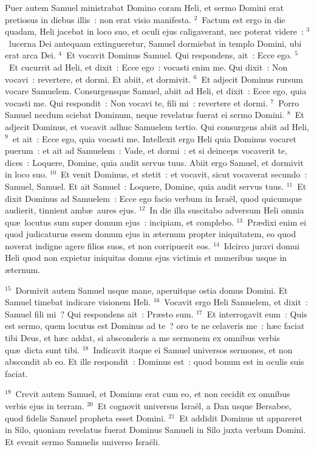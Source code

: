 \lettrine[lines=10,image=true,loversize=0.05,lraise=-0.03]{P}{}uer autem Samuel ministrabat Domino coram Heli, et sermo Domini erat pretiosus in diebus illis~: non erat visio manifesta.
${}^{2}$~Factum est ergo in die quadam, Heli jacebat in loco suo, et oculi ejus caligaverant, nec poterat videre~:
${}^{3}$~lucerna Dei antequam extingueretur, Samuel dormiebat in templo Domini, ubi erat arca Dei.
${}^{4}$~Et vocavit Dominus Samuel. Qui respondens, ait~: Ecce ego.
${}^{5}$~Et cucurrit ad Heli, et dixit~: Ecce ego~: vocasti enim me. Qui dixit~: Non vocavi~: revertere, et dormi. Et abiit, et dormivit.
${}^{6}$~Et adjecit Dominus rursum vocare Samuelem. Consurgensque Samuel, abiit ad Heli, et dixit~: Ecce ego, quia vocasti me. Qui respondit~: Non vocavi te, fili mi~: revertere et dormi.
${}^{7}$~Porro Samuel necdum sciebat Dominum, neque revelatus fuerat ei sermo Domini.
${}^{8}$~Et adjecit Dominus, et vocavit adhuc Samuelem tertio. Qui consurgens abiit ad Heli,
${}^{9}$~et ait~: Ecce ego, quia vocasti me. Intellexit ergo Heli quia Dominus vocaret puerum~: et ait ad Samuelem~: Vade, et dormi~: et si deinceps vocaverit te, dices~: Loquere, Domine, quia audit servus tuus. Abiit ergo Samuel, et dormivit in loco suo.
${}^{10}$~Et venit Dominus, et stetit~: et vocavit, sicut vocaverat secundo~: Samuel, Samuel. Et ait Samuel~: Loquere, Domine, quia audit servus tuus.
${}^{11}$~Et dixit Dominus ad Samuelem~: Ecce ego facio verbum in Isra\"el, quod quicumque audierit, tinnient amb\ae\ aures ejus.
${}^{12}$~In die illa suscitabo adversum Heli omnia qu\ae\ locutus sum super domum ejus~: incipiam, et complebo.
${}^{13}$~Pr\ae dixi enim ei quod judicaturus essem domum ejus in \ae ternum propter iniquitatem, eo quod noverat indigne agere filios suos, et non corripuerit eos.
${}^{14}$~Idcirco juravi domui Heli quod non expietur iniquitas domus ejus victimis et muneribus usque in \ae ternum.


${}^{15}$~Dormivit autem Samuel usque mane, aperuitque ostia domus Domini. Et Samuel timebat indicare visionem Heli.
${}^{16}$~Vocavit ergo Heli Samuelem, et dixit~: Samuel fili mi~? Qui respondens ait~: Pr\ae sto sum.
${}^{17}$~Et interrogavit eum~: Quis est sermo, quem locutus est Dominus ad te~? oro te ne celaveris me~: h\ae c faciat tibi Deus, et h\ae c addat, si absconderis a me sermonem ex omnibus verbis qu\ae\ dicta sunt tibi.
${}^{18}$~Indicavit itaque ei Samuel universos sermones, et non abscondit ab eo. Et ille respondit~: Dominus est~: quod bonum est in oculis suis faciat.


${}^{19}$~Crevit autem Samuel, et Dominus erat cum eo, et non cecidit ex omnibus verbis ejus in terram.
${}^{20}$~Et cognovit universus Isra\"el, a Dan usque Bersabee, quod fidelis Samuel propheta esset Domini.
${}^{21}$~Et addidit Dominus ut appareret in Silo, quoniam revelatus fuerat Dominus Samueli in Silo juxta verbum Domini. Et evenit sermo Samuelis universo Isra\"eli.

